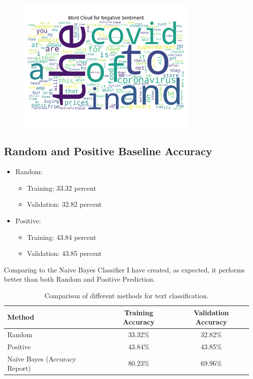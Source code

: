 \documentclass[12pt,a4paper]{article}
\begin{document}
\begin{figure}[H]
\centering
\includegraphics[width=0.8\textwidth]{Assignment 2/q1/wordcloud_Negative.png}
\end{figure}


\subsection{Random and Positive Baseline Accuracy}
\begin{itemize}
    \item Random:
    \begin{itemize}
        \item Training: 33.32 percent
        \item Validation: 32.82 percent
    \end{itemize}

    \item Positive:
    \begin{itemize}
        \item Training: 43.84 percent
        \item Validation: 43.85 percent
    \end{itemize}
\end{itemize}

Comparing to the Naive Bayes Classifier I have created, as expected, it performs better than both Random and Positive Prediction.

\begin{table}[h]
    \centering
    \begin{tabular}{|l|c|c|}
    \hline
    \textbf{Method} & \textbf{Training Accuracy} & \textbf{Validation Accuracy} \\
    \hline
    Random & 33.32\% & 32.82\% \\
    \hline
    Positive & 43.84\% & 43.85\% \\
    \hline
    Naïve Bayes (Accuracy Report) & 80.23\% & 69.96\% \\
    \hline
    \end{tabular}
    \caption{Comparison of different methods for text classification.}
    \label{tab:comparison}
\end{table}
\end{document}
